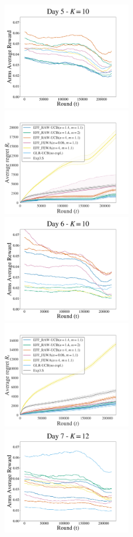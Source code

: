\begin{figure}[p!]
\includegraphics[clip, width= 0.495\textwidth]{2.2Restless/fig/reward_plot_day5.pdf}
\includegraphics[clip, width= 0.495\textwidth]{2.2Restless/fig/DAY5.pdf}
\includegraphics[clip, width= 0.495\textwidth]{2.2Restless/fig/reward_plot_day6.pdf}
\includegraphics[clip, width= 0.495\textwidth]{2.2Restless/fig/DAY6.pdf}
\includegraphics[clip, width= 0.495\textwidth]{2.2Restless/fig/reward_plot_day7.pdf}

\end{figure}
